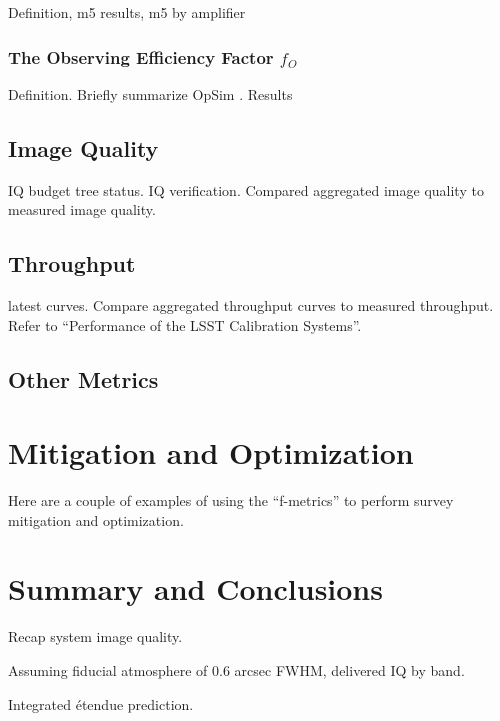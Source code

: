 Definition, m5 results, m5 by amplifier

\subsubsection{The Observing Efficiency Factor $f_O$}

Definition. Briefly summarize OpSim \cite{2018arXiv181004815N}. Results

\subsection{Image Quality}

IQ budget tree status. IQ verification. Compared aggregated image quality to measured image quality.

\subsection{Throughput}

latest curves. Compare aggregated throughput curves to measured throughput. Refer to
``Performance of the LSST Calibration Systems''.

\subsection{Other Metrics}

\section{Mitigation and Optimization}

Here are a couple of examples of using the “f-metrics” to perform survey mitigation and optimization.

\section{Summary and Conclusions}

Recap system image quality.

Assuming fiducial atmosphere of 0.6 arcsec FWHM, delivered IQ by band.

Integrated \'etendue prediction.
